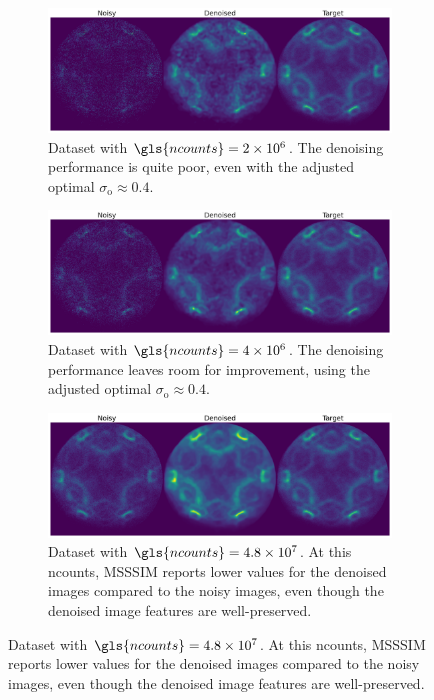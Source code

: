 \begin{figure}
    \centering

    \begin{subfigure}[b]{1\linewidth}
        \centering
        \includegraphics[width=1\linewidth]{images/noisy_denoised_ref_2M_avg_bm3d.pdf}
        \caption{Dataset with $\gls{ncounts}=\num{2e6}$. The denoising performance is quite poor, even with the adjusted optimal $\sigma_{\text{o}}\approx0.4$.}
        \label{fig:noisy-denoised-ref-2M-avg-bm3d}
    \end{subfigure}

    \begin{subfigure}[b]{1\linewidth}
        \centering
        \includegraphics[width=1\linewidth]{images/noisy_denoised_ref_4M_avg_bm3d.pdf}
        \caption{Dataset with $\gls{ncounts}=\num{4e6}$. The denoising performance leaves room for improvement, using the adjusted optimal $\sigma_{\text{o}}\approx0.4$.}
        \label{fig:noisy-denoised-ref-4M-avg-bm3d}
    \end{subfigure}

    \begin{subfigure}[b]{1\linewidth}
        \centering
        \includegraphics[width=1\linewidth]{images/noisy_denoised_ref_48M_avg_bm3d.pdf}
        \caption{Dataset with $\gls{ncounts}=\num{4.8e7}$. At this \gls{ncounts}, \gls{MSSSIM} reports lower values for the denoised images compared to the noisy images, even though the denoised image features are well-preserved.}
        \label{fig:noisy-denoised-ref-48M-avg-bm3d}
    \end{subfigure}


\end{figure}
